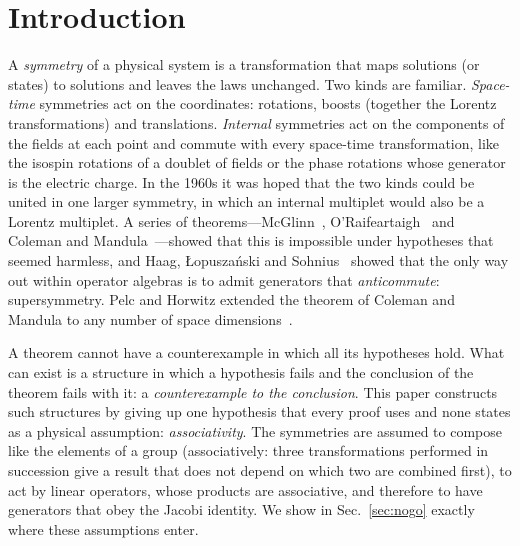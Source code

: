 \section{Introduction}
\label{sec:intro}

A \emph{symmetry} of a physical system is a transformation that maps solutions (or states) to
solutions and leaves the laws unchanged. Two kinds are familiar. \emph{Space-time} symmetries act on
the coordinates: rotations, boosts (together the Lorentz transformations) and translations.
\emph{Internal} symmetries act on the components of the fields at each point and commute with every
space-time transformation, like the isospin rotations of a doublet of fields or the phase rotations
whose generator is the electric charge. In the 1960s it was hoped that the two kinds could be united
in one larger symmetry, in which an internal multiplet would also be a Lorentz multiplet. A series of
theorems---McGlinn~\cite{McGlinn1964}, O'Raifeartaigh~\cite{ORaifeartaigh1965} and Coleman and
Mandula~\cite{ColemanMandula1967}---showed that this is impossible under hypotheses that seemed
harmless, and Haag, {\L}opusza\'nski and Sohnius~\cite{HLS1975} showed that the only way out within
operator algebras is to admit generators that \emph{anticommute}: supersymmetry. Pelc and Horwitz
extended the theorem of Coleman and Mandula to any number of space dimensions~\cite{PelcHorwitz1997}.

A theorem cannot have a counterexample in which all its hypotheses hold. What can exist is a
structure in which a hypothesis fails and the conclusion of the theorem fails with it: a
\emph{counterexample to the conclusion}. This paper constructs such structures by giving up one
hypothesis that every proof uses and none states as a physical assumption: \emph{associativity}.
The symmetries are assumed to compose like the elements of a group (associatively: three
transformations performed in succession give a result that does not depend on which two are combined
first), to act by linear operators, whose products are associative, and therefore to have generators
that obey the Jacobi identity. We show in Sec.~\ref{sec:nogo} exactly where these assumptions enter.

